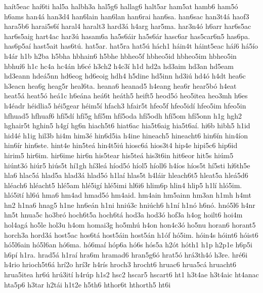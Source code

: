 {ha^^edt5eac
ha^^ed6ti
hal5a
halbh3a
hal5g6
hallag6
halt5ar
ham5at
hamb6
ham5^^f3
h6ams
han4^^e1
han3d4
han6lain
han6lan
han6rai
han6sa.
han6sac
han3t4^^e1
haof3
hara5b6
harai5s6^^ed
haral4
haralt3
hard3^^e1
h4arg
har5ma.
har3n4^^f3
h6arr
har6s5ac
har6s5aig
hart4ac
har3^^fa
hasam6a
ha5s6^^e1ir
ha5s6^^e1r
hasc6ar
has5car6n5
has6pa.
has6p5a^^ed
hast5ait
has6t^^fa.
hat5ar.
hat5ra
hat5^^fa
h^^e1ch1
h^^e1in4t
h^^e1int5eac
h^^e1^^ed6
h^^e15^^edo
h4^^e1r
h1b
h2ba
h5bha
hbhain6
h5bhe
hbheo5f
hbheo5id
hbheo5im
hbheo5in
hbhu^^ed6
h1c
hc4a
hc4^^e1n
h6c^^e9
h3ch2
h4c3^^ed
h1d
hd2a
hd3aim
hd3an
hd5eam
hd3eann
hde^^e15nn
hd6eog
hd6eoig
hdh4
h5dine
hd5inn
hd3i^^fa
hd4^^f3
h4dt
hea6c
h3eacn
hea6g
heag5r
heal6ta.
heana6
heanad5
h4eang
hea6r
hear5b^^f3
h4eat
heat5^^e1
heat5^^f3
he^^e11c
h6e^^e1na
he^^e16t
he^^e1th5
heift5
heod5^^f3
heo5itea
heo3mh
h6es
h4^^e9adr
h^^e9idlia5
h^^e9i5gear
h^^e9im5^^ed
hfach3
hfair5t
hfeo5f
hfeo5id^^ed
hfeo5im
hfeo5in
hfhuad5
hfhuaf6
hf^^ed5d^^ed
hf^^ed5g
hf^^ed5m
hf^^ed5oda
hf^^ed5odh
hf^^ed5om
hf^^ed5onn
h1g
hgh2
hghair5t
hghin5
h4g^^ed
hg6n
hiach5t6
hiat6ac
hia5t6aig
hia5t6a^^ed.
hi6b
hibh5
h1id
hid4^^e9
h1ig
hil3b
hi4m
him3^^e9
hin6d5ia
h4ine
hineach5
hineacht6
hin6^^edn
hin4^^edon
hin6^^edr
hin6ste.
hint4e
hin5te^^e1
hin4t5i^^fa
hiosc6^^e1
hios3t4
hip4e
hipi5c6
hip6id
hirim5
hir6im.
hir6ime
hir6n
his5tear
his5te^^e1
his3t6in
hit6eor
hit5s
hi^^fam5
hi^^fant3^^f3
hi^^far5
hi^^fas5t
h^^ed1gh
h^^ed3le^^e1
h^^edod5^^f3
h^^edol5
h^^edoll6
h4^^edos
h^^edos5t
h^^ed5sti
h^^ed6th5e
hla6
hlac5^^e1
hlad5a
hlad3^^e1
hlad5^^f3
h1la^^ed
hlas5t
h4l^^e1ir
hleach6t5
hleat5a
hle^^e15d6
hl^^e9ach6
hl^^e9acht5
hl^^e95am
hl^^e95ig^^ed
hl^^e95imi
hl6i6
hlim6p
hlin4
hlip5
h1l^^ed
hl^^f35im.
hl^^f35it^^ed
hl6^^fa
hma6
hm4ad
hmad5^^f3
hm4aid.
hm4ain
hm5ainn
hm3an
h1mh
h4mt
hn2
h1na6
hnag5
h1ne
hn6e^^e1n
h1ni
hni^^fa3c
hni^^fach6
h1n^^ed
h1n^^f3
h6n^^f3.
hn^^f35l6
h4nr
hn5t
hnua5c
ho3br^^f3
hoch6t5a
hoch6t^^e1
hod3a
hod3^^f3
hof3a
h4og
hoilt6
hoi4m
hol4ag^^e1
ho5le
hol3u
h4om
homai3g
ho5mh^^fa
h4on
hon4c3^^f3
ho5nu
horan6
horant5
horch3a
hord3^^e1
host5ac
hos6t^^e1
host5^^e1in
host5^^e1n
h1^^f3f
h^^f35im.
h^^f3in4s
h^^f3int6
h^^f3ist6
h^^f35l6ain
h^^f35l6an
h^^f36ma.
h^^f36ma^^ed
h^^f3p6a
h^^f36s
h^^f3s5a
h2^^f3t
h^^f3th1
h1p
h2p1e
h6p5i
h6p^^ed
h1ra.
hrad5^^e1
h1ra^^ed
hra6m
hramad6
hran5g6^^f3
hrat5^^f3
hr^^e13th4^^f3
h3re.
hr^^e96i
h4rio
hrioch5t6^^e1
hr^^ed2o
hr^^ed3r
h4r^^eds
hroch3
hrocht6
hruac6
hrua5c^^e1
hruacht6
hrua5itea
hr6^^fa
hr^^fa3it^^ed
h4r^^fap
h1s2
hsc2
hscar5
hscart6
ht1
h3t4ae
h3t4aic
ht4anac
hta5p6
h3tar
h2t^^e1i
h1t2e
h5th6
hthor6t
hthorth5
ht6i
}
